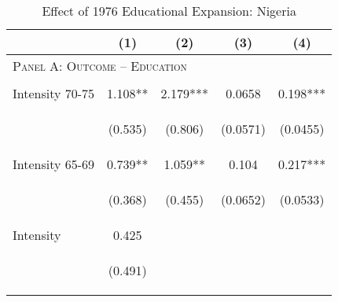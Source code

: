 \begin{subtables}
\begin{table}[htpb!]									
\begin{center}									
\caption{Effect of 1976 Educational Expansion: Nigeria}									
\label{MMRtab:Nigeria}									
\begin{tabular}{p{5cm}cccc}	\toprule								
	&	(1)	&	(2)	&	(3)	&	(4)	\\ \midrule
\multicolumn{5}{l}{\textsc{Panel A: Outcome -- Education}}									\\  
\vspace{4pt}	&	\begin{footnotesize}\end{footnotesize}	&	\begin{footnotesize}\end{footnotesize}	&	\begin{footnotesize}\end{footnotesize}	&	\begin{footnotesize}\end{footnotesize}	 \\
Intensity 70-75	&	1.108**	&	2.179***	&	0.0658	&	0.198***	 \\
	& \begin{footnotesize}	(0.535)	\end{footnotesize} & \begin{footnotesize}	(0.806)	\end{footnotesize} & \begin{footnotesize}	(0.0571)	\end{footnotesize} & \begin{footnotesize}	(0.0455)	\end{footnotesize} \\
Intensity 65-69	&	0.739**	&	1.059**	&	0.104	&	0.217***	 \\
	& \begin{footnotesize}	(0.368)	\end{footnotesize} & \begin{footnotesize}	(0.455)	\end{footnotesize} & \begin{footnotesize}	(0.0652)	\end{footnotesize} & \begin{footnotesize}	(0.0533)	\end{footnotesize} \\
Intensity  	&	0.425	&		&		&		 \\
	& \begin{footnotesize}	(0.491)	\end{footnotesize} & \begin{footnotesize}		\end{footnotesize} & \begin{footnotesize}		\end{footnotesize} & \begin{footnotesize}		\end{footnotesize} \\

\end{tabular}
\end{center}
\end{table}
\end{subtables}
